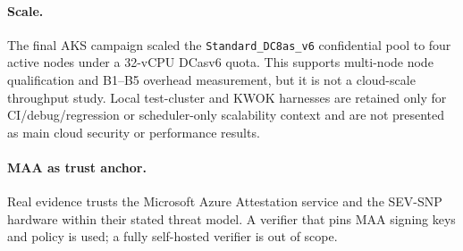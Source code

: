 \paragraph{Scale.}
The final AKS campaign scaled the \texttt{Standard\_DC8as\_v6} confidential pool
to four active nodes under a 32-vCPU DCasv6 quota. This supports multi-node node
qualification and B1--B5 overhead measurement, but it is not a cloud-scale
throughput study. Local test-cluster and KWOK harnesses are retained only for
CI/debug/regression or scheduler-only scalability context and are not presented
as main cloud security or performance results.

\paragraph{MAA as trust anchor.}
Real evidence trusts the Microsoft Azure Attestation service and the SEV-SNP
hardware within their stated threat model. A verifier that pins MAA signing keys
and policy is used; a fully self-hosted verifier is out of scope.
